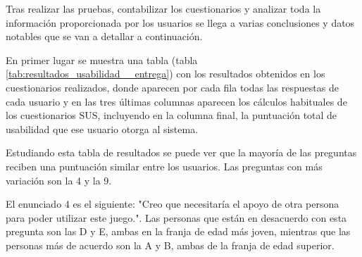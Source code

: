 Tras realizar las pruebas, contabilizar los cuestionarios y analizar toda la información proporcionada por los usuarios se llega a varias conclusiones y datos notables que se van a detallar a continuación.

En primer lugar se muestra una tabla (tabla \ref{tab:resultados_usabilidad__entrega}) con los resultados obtenidos en los cuestionarios realizados, donde aparecen por cada fila todas las respuestas de cada usuario y en las tres últimas columnas aparecen los cálculos habituales de los cuestionarios SUS, incluyendo en la columna final, la puntuación total de usabilidad que ese usuario otorga al sistema.



\begin{table}[H]
	\centering
	\caption{Resultados de usabilidad obtenidos tras las pruebas}
	\label{tab:resultados_usabilidad__entrega}
\end{table}



Estudiando esta tabla de resultados se puede ver que la mayoría de las preguntas reciben una puntuación similar entre los usuarios. Las preguntas con más variación son la 4 y la 9.

El enunciado 4 es el siguiente: "Creo que necesitaría el apoyo de otra persona para poder utilizar este juego.". Las personas que están en desacuerdo con esta pregunta son las D y E, ambas en la franja de edad más joven, mientras que las personas más de acuerdo son la A y B, ambas de la franja de edad superior. 

